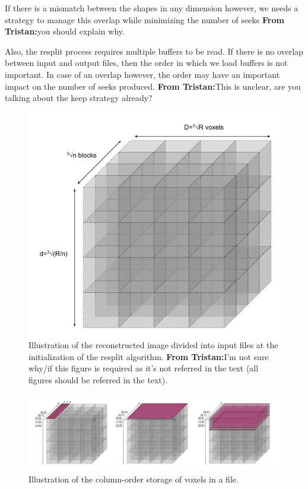 \documentclass[conference]{IEEEtran}
\newcommand{\tristan}[1]{\color{orange}\textbf{From Tristan:}#1\color{black}}
\begin{document}
If there is a mismatch between the shapes in any dimension however, we
needs a strategy to manage this overlap while minimizing the number of
seeks \tristan{you should explain why}.

Also, the resplit process requires multiple buffers to be read. If there is
no overlap between input and output files, then the order in which we load
buffers is not important. In case of an overlap however, the order may have
an important impact on the number of seeks produced. \tristan{This is unclear, are you talking about the keep strategy already?}

\begin{figure}[h!]
\centering
\includegraphics[scale=0.4]{./figures/reconstructed_img_divided.png}
\caption{Illustration of the reconstructed image divided into input files
at the initialization of the resplit algorithm. \tristan{I'm not sure
why/if this figure is required as it's not referred in the text (all
figures should be referred in the text).}
}
\label{fig:reconstructed_img_divided}
\end{figure}

\begin{figure}[h!]
\centering
\includegraphics[scale=0.3]{./figures/column_order.png}
\caption{Illustration of the column-order storage of voxels in a file.
}
\label{fig:column_order}
\end{figure}
\end{document}
